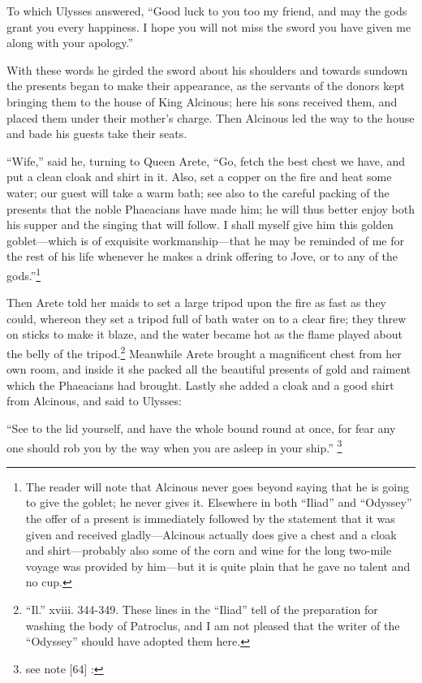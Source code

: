 To which Ulysses answered, “Good luck to you too my friend, and may the gods
grant you every happiness. I hope you will not miss the sword you have given me
along with your apology.”

With these words he girded the sword about his shoulders and towards sundown
the presents began to make their appearance, as the servants of the donors kept
bringing them to the house of King Alcinous; here his sons received them, and
placed them under their mother’s charge. Then Alcinous led the way to the house
and bade his guests take their seats.

“Wife,” said he, turning to Queen Arete, “Go, fetch the best chest we have, and
put a clean cloak and shirt in it. Also, set a copper on the fire and heat some
water; our guest will take a warm bath; see also to the careful packing of the
presents that the noble Phaeacians have made him; he will thus better enjoy
both his supper and the singing that will follow. I shall myself give him this
golden goblet—which is of exquisite workmanship—that he may be reminded of me
for the rest of his life whenever he makes a drink offering to Jove, or to any
of the gods.”\footnote{The reader will note that Alcinous never goes beyond saying that he is going
to give the goblet; he never gives it. Elsewhere in both “Iliad” and “Odyssey”
the offer of a present is immediately followed by the statement that it was
given and received gladly—Alcinous actually does give a chest and a cloak and
shirt—probably also some of the corn and wine for the long two-mile voyage was
provided by him—but it is quite plain that he gave no talent and no cup.}

Then Arete told her maids to set a large tripod upon the fire as fast as they
could, whereon they set a tripod full of bath water on to a clear fire; they
threw on sticks to make it blaze, and the water became hot as the flame played
about the belly of the tripod.\footnote{“Il.” xviii. 344-349. These lines in the “Iliad” tell of the preparation for
washing the body of Patroclus, and I am not pleased that the writer of the
“Odyssey” should have adopted them here.} Meanwhile Arete brought a magnificent
chest from her own room, and inside it she packed all the beautiful presents of
gold and raiment which the Phaeacians had brought. Lastly she added a cloak and
a good shirt from Alcinous, and said to Ulysses:

“See to the lid yourself, and have the whole bound round at once, for fear any
one should rob you by the way when you are asleep in your ship.” \footnote{see note [64] :}

